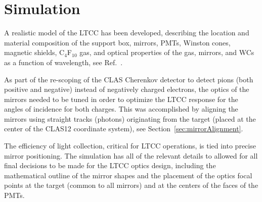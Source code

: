 \section{Simulation}

A realistic model of the LTCC has been developed, describing the location and material composition of the support
box, mirrors, PMTs, Winston cones, magnetic shields, C$_4$F$_{10}$ gas, and optical properties of the gas, mirrors,
and WCs as a function of wavelength, see Ref.~\cite{sim-nim}.

As part of the re-scoping of the CLAS Cherenkov detector to detect pions (both positive and negative) instead of
negatively charged electrons, the optics of the mirrors needed to be tuned in order to optimize the LTCC response
for the angles of incidence for both charges. This was accomplished by aligning the mirrors using straight tracks
(photons) originating from the target (placed at the center of the CLAS12 coordinate system), see
Section~\ref{sec:mirrorAlignment}.

The efficiency of light collection, critical for LTCC operations, is tied into precise mirror positioning. The simulation
has all of the relevant details to allowed for all final decisions to be made for the LTCC optics design, including the
mathematical outline of the mirror shapes and the placement of the optics focal points at the target (common to all
mirrors) and at the centers of the faces of the PMTs.


